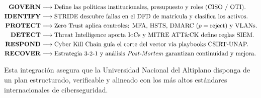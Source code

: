 \begin{small}
\[
\begin{aligned} 
\mathbf{GOVERN} &\longrightarrow \text{Define las políticas institucionales, presupuesto y roles (CISO / OTI).} \\ 
\mathbf{IDENTIFY} &\longrightarrow \text{STRIDE descubre fallas en el DFD de matrícula y clasifica los activos.} \\ 
\mathbf{PROTECT} &\longrightarrow \text{Zero Trust aplica controles: MFA, HSTS, DMARC } (p=\text{reject}) \text{ y VLANs.} \\ 
\mathbf{DETECT} &\longrightarrow \text{Threat Intelligence aporta IoCs y MITRE ATT\&CK define reglas SIEM.} \\ 
\mathbf{RESPOND} &\longrightarrow \text{Cyber Kill Chain guía el corte del vector vía playbooks CSIRT-UNAP.} \\ 
\mathbf{RECOVER} &\longrightarrow \text{Estrategia 3-2-1 y análisis \textit{Post-Mortem} garantizan continuidad y mejora.} 
\end{aligned}
\]
\end{small}

\vspace{0.2cm}

Esta integración asegura que la Universidad Nacional del Altiplano disponga de un plan estructurado, verificable y alineado con los más altos estándares internacionales de ciberseguridad.